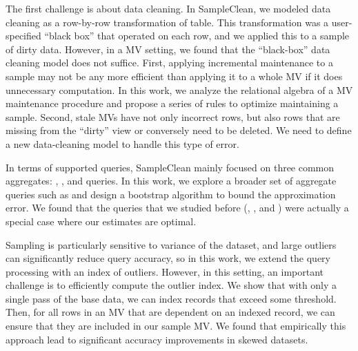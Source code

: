 The first challenge is about data cleaning. In SampleClean, we modeled data cleaning as a row-by-row transformation of table. 
This transformation was a user-specified  ``black box'' that operated on each row, and we applied this to a sample of dirty data.
However, in a MV setting, we found that the ``black-box'' data cleaning model does not suffice.
First, applying incremental maintenance to a sample may not be any more efficient than applying it to a whole MV if it does unnecessary computation.
In this work, we analyze the relational algebra of a MV maintenance procedure and propose a series of rules to optimize maintaining a sample.
Second, stale MVs have not only incorrect rows, but also rows that are missing from the ``dirty'' view or conversely need to be deleted. We need to define a new data-cleaning model to handle this type of error. 

In terms of supported queries, SampleClean mainly focused on three common aggregates: \sumfunc, \avgfunc, and \countfunc queries.
In this work, we explore a broader set of aggregate queries such as \medfunc and design a bootstrap algorithm to bound the approximation error.
We found that the queries that we studied before (\sumfunc, \avgfunc, and \countfunc) were actually a special case where our estimates are optimal.

Sampling is particularly sensitive to variance of the dataset, and large outliers can significantly reduce query accuracy, so in this work, we extend the query processing with an index of outliers.
However, in this setting, an important challenge is to efficiently compute the outlier index.
We show that with only a single pass of the base data, we can index records that exceed some threshold.
Then, for all rows in an MV that are dependent on an indexed record, we can ensure that they are included in our sample MV.
We found that empirically this approach lead to significant accuracy improvements in skewed datasets.

